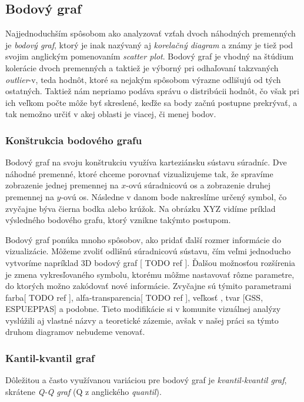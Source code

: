 \subsection{Bodový graf}
\label{subsec:scatterplot}
Najjednoduchším spôsobom ako analyzovať vzťah dvoch náhodných premenných je \textit{bodový graf}, ktorý je inak nazývaný aj \textit{korelačný diagram} a známy je tiež pod svojim anglickým pomenovaním \textit{scatter plot}. Bodový graf je vhodný na štúdium kolerácie dvoch premenných a taktiež je výborný pri odhaľovaní takzvaných \textit{outlier}-v, teda hodnôt, ktoré sa nejakým spôsobom výrazne odlišujú od tých ostatných. Taktiež nám nepriamo podáva správu o distribúcii hodnôt, čo však pri ich veľkom počte môže byť skreslené, keďže sa body začnú postupne prekrývať, a tak nemožno určiť v akej oblasti je viacej, či menej bodov.


\subsubsection{Konštrukcia bodového grafu}
Bodový graf na svoju konštrukciu využíva karteziánsku sústavu súradníc. Dve náhodné premenné, ktoré chceme porovnať vizualizujeme tak, že spravíme zobrazenie jednej premennej na $ x $-ovú súradnicovú os a zobrazenie druhej premennej na $ y $-ovú os. Následne v danom bode nakreslíme určený symbol, čo zvyčajne býva čierna bodka alebo krúžok. 
Na obrázku XYZ vidíme príklad výsledného bodového grafu, ktorý vznikne takýmto postupom.

Bodový graf ponúka mnoho spôsobov, ako pridať ďalší rozmer informácie do vizualizácie. Môžeme zvoliť odlišnú súradnicovú sústavu, čím veľmi jednoducho vytvoríme napríklad 3D bodový graf [ TODO ref ]. Ďalšou možnosťou rozšírenia je zmena vykresľovaného symbolu, ktorému môžme nastavovať rôzne parametre, do ktorých možno zakódovať nové informácie. Zvyčajne sú týmito parametrami farba[ TODO ref ], alfa-transparencia[ TODO ref ], veľkosť \cite{Viegas}, tvar [GSS, ESPUEPPAS] a podobne. Tieto modifikácie si v komunite vizuálnej analýzy vyslúžili aj vlastné názvy a teoretické zázemie, avšak v našej práci sa týmto druhom diagramov nebudeme venovať.

\subsubsection{Kantil-kvantil graf}
Dôležitou a často využívanou variáciou pre bodový graf je \textit{kvantil-kvantil graf}, skrátene \textit{Q-Q graf} (Q z anglického \textit{quantil}).

